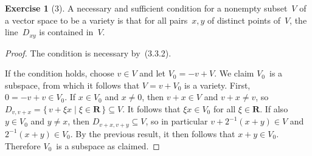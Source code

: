 \documentclass[letterpaper,12pt]{article}
\newcommand{\R}{\mathbf{R}}
\theoremstyle{definition}
\newtheorem*{exer}{Exercise}
\theoremstyle{remark}
\begin{document}
\begin{exer}[3]
A necessary and sufficient condition for a nonempty subset~\(V\) of a vector space to be a variety is that for all pairs~\(x,y\) of distinct points of~\(V\), the line~\(D_{xy}\) is contained in~\(V\).
\end{exer}
\begin{proof}
The condition is necessary by~(3.3.2).

If the condition holds, choose \(v\in V\) and let \(V_0=-v+V\). We claim \(V_0\)~is a subspace, from which it follows that \(V=v+V_0\) is a variety. First, \(0=-v+v\in V_0\). If \(x\in V_0\) and \(x\ne 0\), then \(v+x\in V\) and \(v+x\ne v\), so \(D_{v,v+x}=\{\,v+\xi x\mid\xi\in\R\,\}\subseteq V\). It follows that \(\xi x\in V_0\) for all \(\xi\in\R\). If also \(y\in V_0\) and \(y\ne x\), then \(D_{v+x,v+y}\subseteq V\), so in particular \(v+2^{-1}(x+y)\in V\) and \(2^{-1}(x+y)\in V_0\). By the previous result, it then follows that \(x+y\in V_0\). Therefore \(V_0\)~is a subspace as claimed.
\end{proof}
\end{document}
